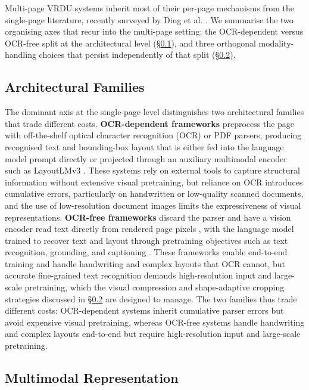 \documentclass[11pt]{article}
\begin{document}
Multi-page VRDU systems inherit most of their per-page mechanisms from the single-page literature, recently surveyed by Ding et al. \cite{ding2025survey}. We summarise the two organising axes that recur into the multi-page setting: the OCR-dependent versus OCR-free split at the architectural level (\S\ref{sec:bg-architecture}), and three orthogonal modality-handling choices that persist independently of that split (\S\ref{sec:bg-modality}).

\subsection{Architectural Families}
\label{sec:bg-architecture}

The dominant axis at the single-page level distinguishes two architectural families that trade different costs. \textbf{OCR-dependent frameworks} preprocess the page with off-the-shelf optical character recognition (OCR) or PDF parsers, producing recognised text and bounding-box layout that is either fed into the language model prompt directly \cite{wang2024docllm,he2023icld3ie} or projected through an auxiliary multimodal encoder such as LayoutLMv3 \cite{huang2022layoutlmv3,luo2024layoutllm}. These systems rely on external tools to capture structural information without extensive visual pretraining, but reliance on OCR introduces cumulative errors, particularly on handwritten or low-quality scanned documents, and the use of low-resolution document images limits the expressiveness of visual representations. \textbf{OCR-free frameworks} discard the parser and have a vision encoder read text directly from rendered page pixels \cite{kim2021donut,ye2023ureader,hu2024mplugdocowl}, with the language model trained to recover text and layout through pretraining objectives such as text recognition, grounding, and captioning \cite{wang2023towards,feng2023unidoc,liu2024textmonkey}. These frameworks enable end-to-end training and handle handwriting and complex layouts that OCR cannot, but accurate fine-grained text recognition demands high-resolution input and large-scale pretraining, which the visual compression and shape-adaptive cropping strategies discussed in \S\ref{sec:bg-modality} are designed to manage. The two families thus trade different costs: OCR-dependent systems inherit cumulative parser errors but avoid expensive visual pretraining, whereas OCR-free systems handle handwriting and complex layouts end-to-end but require high-resolution input and large-scale pretraining.

\subsection{Multimodal Representation}
\label{sec:bg-modality}
\end{document}

